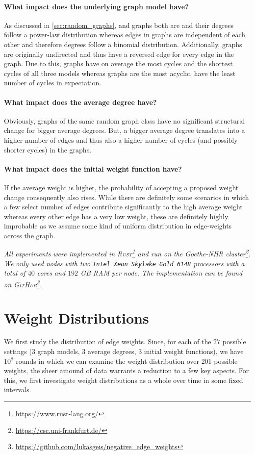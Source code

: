 \paragraph{What impact does the underlying graph model have?}
As discussed in \cref{sec:random_graphs}, \rhg and \dsf graphs both are  and their degrees follow a power-law distribution whereas edges in \gnp graphs are independent of each other and therefore degrees follow a binomial distribution.
Additionally, \rhg graphs are originally undirected and thus have a reversed edge for every edge in the graph.
Due to this, \rhg graphs have on average the most cycles and the shortest cycles of all three models whereas \dsf graphs are the most acyclic, \ie have the least number of cycles in expectation.

\paragraph{What impact does the average degree have?}
Obviously, graphs of the same random graph class have no significant structural change for bigger average degrees.
But, a bigger average degree translates into a higher number of edges and thus also a higher number of cycles (and possibly shorter cycles) in the graphs.


\paragraph{What impact does the initial weight function have?}
If the average weight is higher, the probability of accepting a proposed weight change consequently also rises.
While there are definitely some scenarios in which a few select number of edges contribute significantly to the high average weight whereas every other edge has a very low weight, these are definitely highly improbable as we assume some kind of uniform distribution in edge-weights across the graph.

\bigskip

\noindent
\textit{%
  All experiments were implemented in \textsc{Rust}\footnote{\url{https://www.rust-lang.org/}} and run on the Goethe-NHR cluster\footnote{\url{https://csc.uni-frankfurt.de/}}.
  We only used nodes with two \texttt{Intel Xeon Skylake Gold 6148} processors with a total of $40$ cores and $192$ GB RAM per node. The implementation can be found on \textsc{GitHub}\footnote{\url{https://github.com/lukasgeis/negative_edge_weights}}.
}


\section{Weight Distributions}\label{sec:exp_weights}
We first study the distribution of edge weights.
Since, for each of the $27$ possible settings ($3$ graph models, $3$ average degrees, $3$ initial weight functions), we have $10^8$ rounds in which we can examine the weight distribution over $201$ possible weights, the sheer amound of data warrants a reduction to a few key aspects.
For this, we first investigate weight distributions as a whole over time in some fixed intervals.

